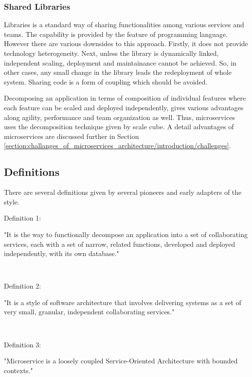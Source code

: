 \subsubsection{Shared Libraries}\label{section:context/microservices_architecture_style/decompostion_of_an_application/shared_libraries}
Libraries is a standard way of sharing functionalities among various services and teams. The capability is provided by the feature of programming language. However there are various downsides to this approach. Firstly, it does not provide technology heterogeneity. Next, unless the library is dynamically linked, independent scaling, deployment and maintainance cannot be achieved. So, in other cases, any small change in the library leads the redeployment of whole system. Sharing code is a form of coupling which should be avoided.

Decomposing an application in terms of composition of individual features where each feature can be scaled and deployed independently, gives various advantages along agility, performance and team organization as well. Thus, microservices uses the decomposition technique given by scale cube. A detail advantages of microservices are discussed further in Section \ref{section:challanges_of_microservices_architecture/introduction/challenges}.
\subsection{Definitions}\label{section:context/microservices_architecture_style/definitions}
There are several definitions given by several pioneers and early adapters of the style.
\\
\begin{shaded}Definition 1: \cite{Richardson:2014ac} \end{shaded}
"It is the way to functionally decompose an application into a set of collaborating services, each with a set of narrow, related functions, developed and deployed independently, with its own database."

\\
\begin{shaded}Definition 2: \cite{Wootton:2014aa}\end{shaded}
"It is a style of software architecture that involves delivering systems as a set of very small, granular, independent collaborating services."


\\
\begin{shaded}Definition 3: \cite{Cockcroft:2015aa}\end{shaded}
"Microservice is a loosely coupled Service-Oriented Architecture with bounded contexts."


